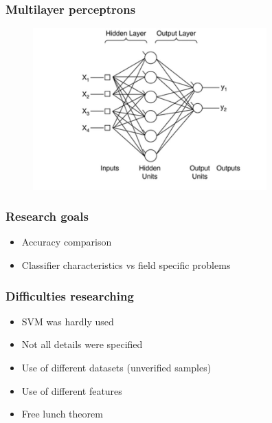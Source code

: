 \documentclass{beamer}
\begin{document}

\begin{frame}
\frametitle{Multilayer perceptrons}

	\begin{figure}
		\centering
    	\includegraphics[width=90mm,scale=1]{./img/MLP.jpg}
	\end{figure}

\end{frame}



\begin{frame}
\frametitle{Research goals}

	\begin{itemize}
		\item Accuracy comparison
		\item Classifier characteristics vs field specific problems
	 \end{itemize}
	 
\end{frame}


\begin{frame}
\frametitle{Difficulties researching}

	\begin{itemize}
		\item SVM was hardly used
		\item Not all details were specified
		\item Use of different datasets (unverified samples)
		\item Use of different features
		\item Free lunch theorem	 
	\end{itemize}

\end{frame}
\end{document}
